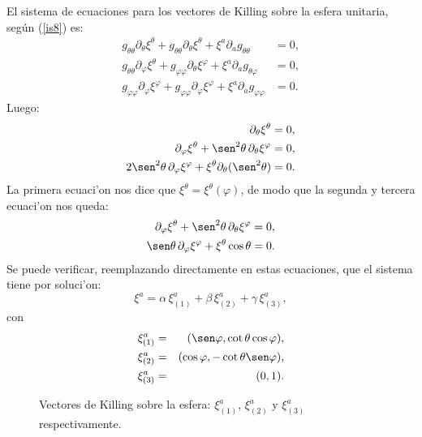 El sistema de ecuaciones para los vectores de Killing sobre la esfera unitaria,
seg\'{u}n (\ref{is8}) es:
\begin{align}
g_{\theta\theta}\partial_\theta\xi^\theta+g_{\theta\theta}\partial_\theta\xi^\theta +\xi^a\partial_ag_{\theta\theta}  &  =0,\label{isej12}\\
g_{\theta\theta}\partial_\varphi\xi^\theta+g_{\varphi\varphi}\partial_\theta\xi^\varphi +\xi^a\partial_ag_{\theta\varphi}  &  =0, \\
g_{\varphi\varphi}\partial_\varphi\xi^\varphi+g_{\varphi\varphi}\partial_\varphi\xi^\varphi +\xi^a\partial_ag_{\varphi\varphi}  &  =0.
\end{align}
Luego:
\begin{align}
\partial_\theta\xi^\theta  &  =0,\label{isej13}\\
\partial_\varphi\xi^\theta+\sen^2\theta\,\partial_\theta\xi^\varphi  &  =0, \\
2\sen^2\theta\,\partial_\varphi\xi^\varphi+\xi^\theta\partial_\theta(\sen^2\theta)  & =0.
\end{align}
La primera ecuaci'on nos dice que $\xi^\theta=\xi^\theta(\varphi)$, de modo que la
segunda y tercera ecuaci'on nos queda:
\begin{align}
\partial_\varphi\xi^\theta+\sen^2\theta\,\partial_\theta\xi^\varphi  &
=0,\label{isej14}\\
\sen\theta\,\partial_\varphi\xi^\varphi+\xi^\theta\cos\theta  &  =0.
\end{align}
Se puede verificar, reemplazando directamente en estas ecuaciones, que el
sistema tiene por soluci'on:
\begin{equation}
\xi^a=\alpha\,\xi^a_{(1)} +\beta\,\xi^a_{(2)} +\gamma\,\xi^a_{(3)}
,\label{isej15}
\end{equation}
con
\begin{eqnarray}
\xi^a_{(1)} &=&(\sen\varphi, \cot\theta\cos\varphi ), \\
\xi^a_{(2)} &=&(\cos\varphi,-\cot\theta\sen\varphi) , \\
\xi^a_{(3)} &=&(0,1).
\end{eqnarray}

\begin{center}
\begin{figure}[H]
\centerline{\hfill{}\hfill{}}
\caption{Vectores de Killing sobre la esfera: 
$\xi^a_{(1)}$, $\xi^a_{(2)}$ y $\xi^a_{(3)}$ respectivamente.}
\label{KS2}
\end{figure}
\end{center}

